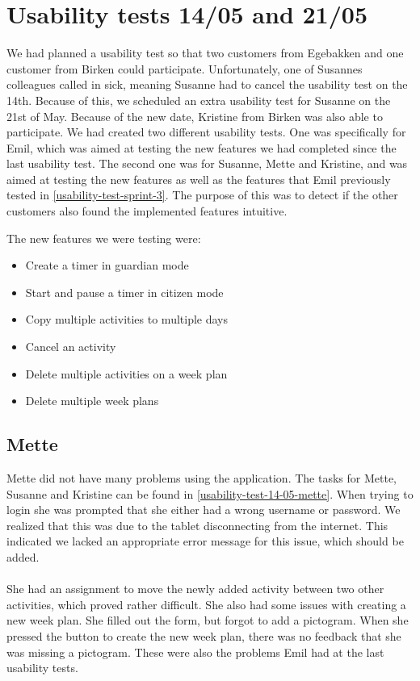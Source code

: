 \section{Usability tests 14/05 and 21/05}\label{usability-test-14-21-05}
We had planned a usability test so that two customers from Egebakken and one customer from Birken could participate.
Unfortunately, one of Susannes colleagues called in sick, meaning Susanne had to cancel the usability test on the 14th.
Because of this, we scheduled an extra usability test for Susanne on the 21st of May. 
Because of the new date, Kristine from Birken was also able to participate. 
We had created two different usability tests. 
One was specifically for Emil, which was aimed at testing the new features we had completed since the last usability test.
The second one was for Susanne, Mette and Kristine, and was aimed at testing the new features as well as the features that Emil previously tested in \autoref{usability-test-sprint-3}. 
The purpose of this was to detect if the other customers also found the implemented features intuitive.

The new features we were testing were:

\begin{itemize}
  \item Create a timer in guardian mode
  \item Start and pause a timer in citizen mode
  \item Copy multiple activities to multiple days
  \item Cancel an activity
  \item Delete multiple activities on a week plan
  \item Delete multiple week plans
\end{itemize}


\subsection{Mette}
Mette did not have many problems using the application.
The tasks for Mette, Susanne and Kristine can be found in \autoref{usability-test-14-05-mette}.
When trying to login she was prompted that she either had a wrong username or password. 
We realized that this was due to the tablet disconnecting from the internet.
This indicated we lacked an appropriate error message for this issue, which should be added.
\\\\
She had an assignment to move the newly added activity between two other activities, which proved rather difficult. 
She also had some issues with creating a new week plan.
She filled out the form, but forgot to add a pictogram. 
When she pressed the button to create the new week plan, there was no feedback that she was missing a pictogram.
These were also the problems Emil had at the last usability tests.

